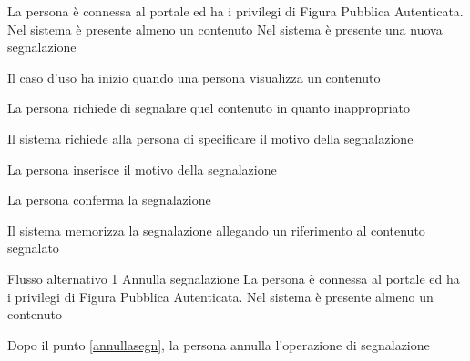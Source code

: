 {}
{La persona è connessa al portale ed ha i privilegi di Figura Pubblica Autenticata. Nel sistema è presente almeno un \gls{contenuto}}
{Nel sistema è presente una nuova segnalazione}
{\begin{enumCU}
	\item Il caso d'uso ha inizio quando una persona visualizza un \gls{contenuto}
	\item La persona richiede di segnalare quel \gls{contenuto} in quanto inappropriato
	\item Il sistema richiede alla persona di specificare il motivo della segnalazione
	\item La persona inserisce il motivo della segnalazione\label{annullasegn}
	\item La persona conferma la segnalazione
	\item Il sistema memorizza la segnalazione allegando un \gls{riferimento} al contenuto segnalato
\end{enumCU}}
%
{Flusso alternativo 1}%
{Annulla segnalazione}%
{La persona è connessa al portale ed ha i privilegi di Figura Pubblica Autenticata. Nel sistema è presente almeno un \gls{contenuto}}
{\postNulle}%
{\begin{enumCU}
		\item Dopo il punto \ref{annullasegn}, la persona annulla l'operazione di segnalazione
	\end{enumCU}}%

\tabcuvspace

